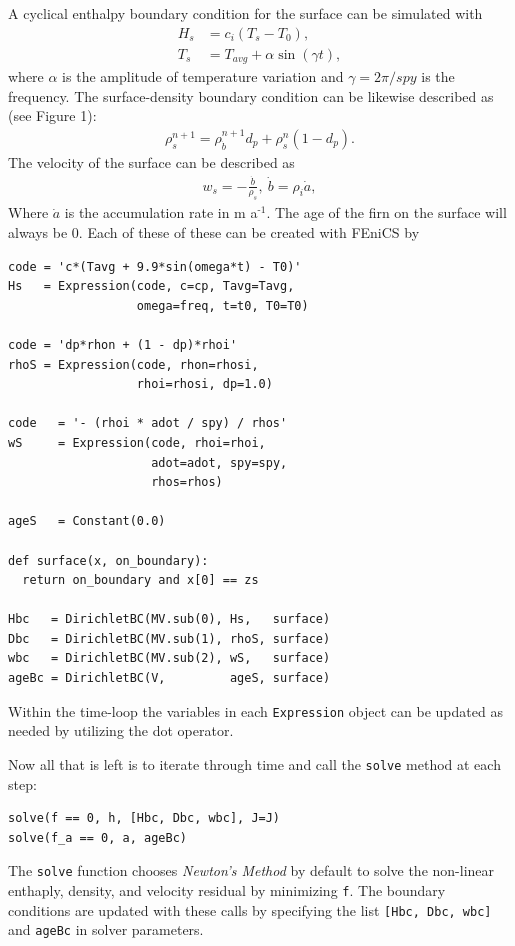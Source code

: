 \documentclass{article}%
\newcommand{\sups}[1]{\ensuremath{^{\textrm{#1}}}}
\begin{document}
A cyclical enthalpy boundary condition for the surface can be simulated with 
\begin{align*}
    H_s &= c_i ( T_s - T_0 ),\\
    T_s &= T_{avg} + \alpha \sin(\gamma t),
\end{align*}
where $\alpha$ is the amplitude of temperature variation and $\gamma = 2\pi / spy$ is the frequency.  The surface-density boundary condition can be likewise described as (see Figure 1): 
\begin{align*}
    \rho_s^{n+1} = \rho_{\dot{b}}^{n+1} d_p + \rho_s^{n} (1 - d_p).
\end{align*}
The velocity of the surface can be described as 
\begin{align*}
  w_s = -\frac{\dot{b}}{\rho_s},\ \dot{b} = \rho_i \dot{a},
\end{align*}
Where $\dot{a}$ is the accumulation rate in m a\sups{-1}.
The age of the firn on the surface will always be 0.
Each of these of these can be created with FEniCS by
\footnotesize
\begin{verbatim}
code = 'c*(Tavg + 9.9*sin(omega*t) - T0)'
Hs   = Expression(code, c=cp, Tavg=Tavg, 
                  omega=freq, t=t0, T0=T0)

code = 'dp*rhon + (1 - dp)*rhoi'
rhoS = Expression(code, rhon=rhosi, 
                  rhoi=rhosi, dp=1.0)

code   = '- (rhoi * adot / spy) / rhos'
wS     = Expression(code, rhoi=rhoi, 
                    adot=adot, spy=spy, 
                    rhos=rhos)

ageS   = Constant(0.0)

def surface(x, on_boundary):
  return on_boundary and x[0] == zs

Hbc   = DirichletBC(MV.sub(0), Hs,   surface)
Dbc   = DirichletBC(MV.sub(1), rhoS, surface)
wbc   = DirichletBC(MV.sub(2), wS,   surface)
ageBc = DirichletBC(V,         ageS, surface)
\end{verbatim}
\normalsize
Within the time-loop the variables in each \texttt{Expression} object can be updated as needed by utilizing the dot operator.

Now all that is left is to iterate through time and call the \texttt{solve} method at each step:\par
\footnotesize
\begin{verbatim}
solve(f == 0, h, [Hbc, Dbc, wbc], J=J)
solve(f_a == 0, a, ageBc)
\end{verbatim}
\normalsize
The \texttt{solve} function chooses \emph{Newton's Method} by default to solve the non-linear enthaply, density, and velocity residual by minimizing \texttt{f}.  The boundary conditions are updated with these calls by specifying the list \texttt{[Hbc, Dbc, wbc]} and \texttt{ageBc} in solver parameters.
\end{document}
